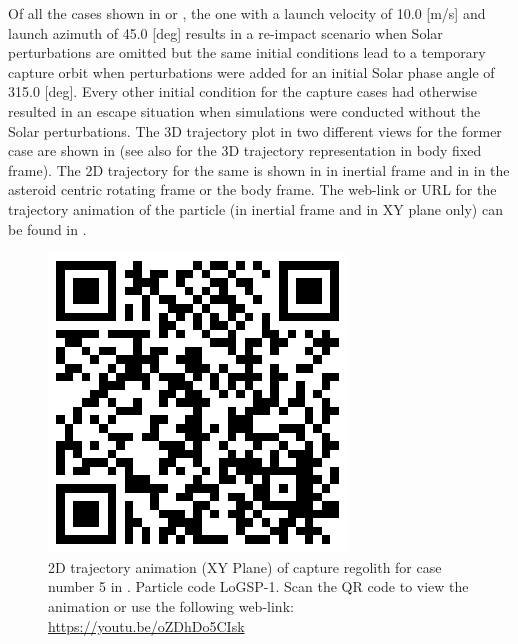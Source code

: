 %
\newline\newline
%
Of all the cases shown in  or , the one with a launch velocity of 10.0 [m/s] and launch azimuth of 45.0 [deg] results in a re-impact scenario when Solar perturbations are omitted but the same initial conditions lead to a temporary capture orbit when perturbations were added for an initial Solar phase angle of 315.0 [deg]. Every other initial condition for the capture cases had otherwise resulted in an escape situation when simulations were conducted without the Solar perturbations. The 3D trajectory plot in two different views for the former case are shown in  (see  also for the 3D trajectory representation in body fixed frame). The 2D trajectory for the same is shown in  in inertial frame and in  in the asteroid centric rotating frame or the body frame. The web-link or URL for the trajectory animation of the particle (in inertial frame and in XY plane only) can be found in .
\begin{figure}[htb]
\centering
\captionsetup{justification=centering}
\includegraphics[scale=0.2]{longest_edge_perturbations/3.2Density_1cmSize/qrcode_10ms_45Azimuth_315SolarPhase.png}
\caption{2D trajectory animation (XY Plane) of capture regolith for case number 5 in . Particle code LoGSP-1. Scan the QR code to view the animation or use the following web-link: \url{https://youtu.be/oZDhDo5CIsk}}
\label{fig:LoGSP_1_capture_case_5_2d_trajectory_animation}
\end{figure}
